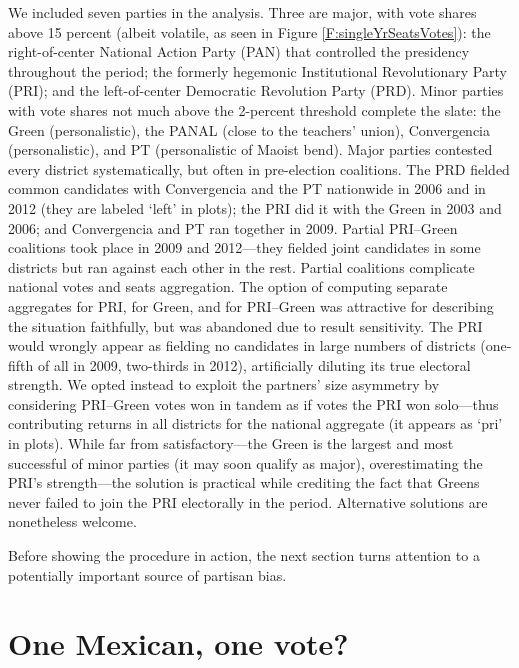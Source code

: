 \documentclass[letter,12pt]{article}
\begin{document}
We included seven parties in the analysis. Three are major, with vote shares above 15 percent (albeit volatile, as seen in Figure \ref{F:singleYrSeatsVotes}): the right-of-center National Action Party (PAN) that controlled the presidency throughout the period; the formerly hegemonic Institutional Revolutionary Party (PRI); and the left-of-center Democratic Revolution Party (PRD). Minor parties with vote shares not much above the 2-percent threshold complete the slate: the Green (personalistic), the PANAL (close to the teachers' union), Convergencia (personalistic), and PT (personalistic of Maoist bend). Major parties contested every district systematically, but often in pre-election coalitions. The PRD fielded common candidates with Convergencia and the PT nationwide in 2006 and in 2012 (they are labeled `left' in plots); the PRI did it with the Green in 2003 and 2006; and Convergencia and PT ran together in 2009. Partial PRI--Green coalitions took place in 2009 and 2012---they fielded joint candidates in some districts but ran against each other in the rest. Partial coalitions complicate national votes and seats aggregation. The option of computing separate aggregates for PRI, for Green, and for PRI--Green was attractive for describing the situation faithfully, but was abandoned due to result sensitivity. The PRI would wrongly appear as fielding no candidates in large numbers of districts (one-fifth of all in 2009, two-thirds in 2012), artificially diluting its true electoral strength. We opted instead to exploit the partners' size asymmetry by considering PRI--Green votes won in tandem as if votes the PRI won solo---thus contributing returns in all districts for the national aggregate (it appears as `pri' in plots). While far from satisfactory---the Green is the largest and most successful of minor parties (it may soon qualify as major), overestimating the PRI's strength---the solution is practical while crediting the fact that Greens never failed to join the PRI electorally in the period. Alternative solutions are nonetheless welcome. 

Before showing the procedure in action, the next section turns attention to a potentially important source of partisan bias. 

\section{One Mexican, one vote?}

\end{document}
